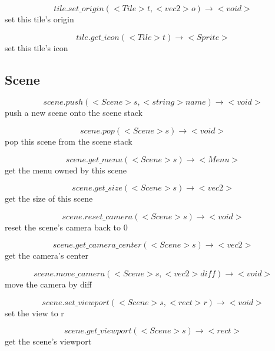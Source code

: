 \documentclass[11pt,fleqn]{book} %
\begin{document}
\begin{equation}
tile.set\_origin(<Tile> t, <vec2> o) \rightarrow <void>
\end{equation}
set this tile's origin

\begin{equation}
tile.get\_icon(<Tile> t) \rightarrow <Sprite>
\end{equation}
set this tile's icon

\subsection{Scene}
\begin{equation}
scene.push(<Scene> s, <string> name) \rightarrow <void>
\end{equation}
push a new scene onto the scene stack

\begin{equation}
scene.pop(<Scene> s) \rightarrow <void>
\end{equation}
pop this scene from the scene stack

\begin{equation}
scene.get\_menu(<Scene> s) \rightarrow <Menu>
\end{equation}
get the menu owned by this scene

\begin{equation}
scene.get\_size(<Scene> s) \rightarrow <vec2>
\end{equation}
get the size of this scene

\begin{equation}
scene.reset\_camera(<Scene> s) \rightarrow <void>
\end{equation}
reset the scene's camera back to 0

\begin{equation}
scene.get\_camera\_center(<Scene> s) \rightarrow <vec2>
\end{equation}
get the camera's center

\begin{equation}
scene.move\_camera(<Scene> s, <vec2> diff) \rightarrow <void>
\end{equation}
move the camera by diff

\begin{equation}
scene.set\_viewport(<Scene> s, <rect> r) \rightarrow <void>
\end{equation}
set the view to r

\begin{equation}
scene.get\_viewport(<Scene> s) \rightarrow <rect>
\end{equation}
get the scene's viewport
\end{document}
